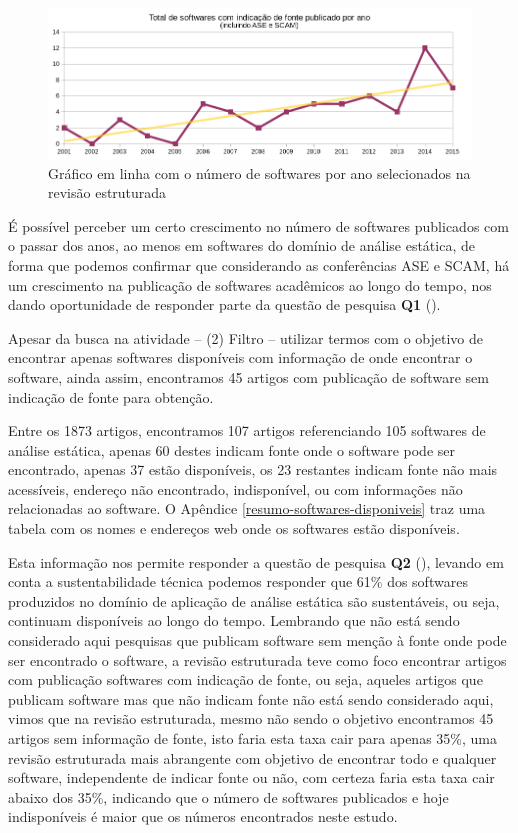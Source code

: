 \begin{figure}[h]
  \center
  \includegraphics[scale=0.65]{imagens/softwares-por-ano.png}
  \caption{Gráfico em linha com o número de softwares por ano selecionados na revisão estruturada}
  \label{softwares-por-ano}
\end{figure}

É possível perceber um certo crescimento no número de softwares publicados com
o passar dos anos, ao menos em softwares do domínio de análise estática, de
forma que podemos confirmar que considerando as conferências ASE e SCAM, há um
crescimento na publicação de softwares acadêmicos ao longo do tempo, nos dando
oportunidade de responder parte da questão de pesquisa {\bf Q1} (\QuestaoUm).

Apesar da busca na atividade -- (2) Filtro -- utilizar termos com o objetivo de
encontrar apenas softwares disponíveis com informação de onde encontrar o
software, ainda assim, encontramos 45 artigos com publicação de software sem
indicação de fonte para obtenção.

Entre os 1873 artigos, encontramos 107 artigos referenciando 105 softwares de
análise estática, apenas 60 destes indicam fonte onde o software pode ser
encontrado, apenas 37 estão disponíveis, os 23 restantes indicam fonte não mais
acessíveis, endereço não encontrado, indisponível, ou com informações não
relacionadas ao software. O Apêndice \ref{resumo-softwares-disponiveis} traz
uma tabela com os nomes e endereços web onde os softwares estão disponíveis.

Esta informação nos permite responder a questão de pesquisa {\bf Q2}
(\QuestaoDois), levando em conta a sustentabilidade técnica podemos responder que 61\% dos
softwares produzidos no domínio de aplicação de análise estática são
sustentáveis, ou seja, continuam disponíveis ao longo do tempo. Lembrando que
não está sendo considerado aqui pesquisas que publicam software sem menção à
fonte onde pode ser encontrado o software, a revisão estruturada teve como foco encontrar
artigos com publicação softwares com indicação de fonte, ou seja, aqueles
artigos que publicam software mas que não indicam fonte não está sendo
considerado aqui, vimos que na revisão estruturada, mesmo não sendo o objetivo
encontramos 45 artigos sem informação de fonte, isto faria esta taxa cair para
apenas 35\%, uma revisão estruturada mais abrangente com objetivo de encontrar
todo e qualquer software, independente de indicar fonte ou não, com certeza
faria esta taxa cair abaixo dos 35\%, indicando que o número de softwares
publicados e hoje indisponíveis é maior que os números encontrados neste estudo.

